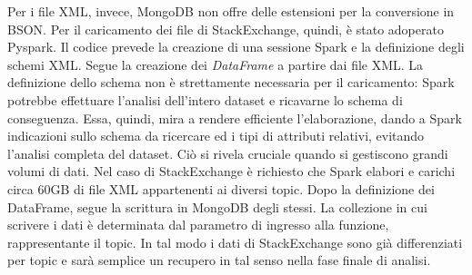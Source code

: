 Per i file XML, invece, MongoDB non offre delle estensioni per la conversione in BSON. Per il caricamento dei file di StackExchange, quindi, è stato adoperato Pyspark. Il codice prevede la creazione di una sessione Spark e la definizione degli schemi XML. Segue la creazione dei \emph{DataFrame} a partire dai file XML. La definizione dello schema non è strettamente necessaria per il caricamento: Spark potrebbe effettuare l'analisi dell'intero dataset e ricavarne lo schema di conseguenza. Essa, quindi, mira a rendere efficiente l'elaborazione, dando a Spark indicazioni sullo schema da ricercare ed i tipi di attributi relativi, evitando l'analisi completa del dataset. Ciò si rivela cruciale quando si gestiscono grandi volumi di dati. Nel caso di StackExchange è richiesto che Spark elabori e carichi circa 60GB di file XML appartenenti ai diversi topic. Dopo la definizione dei DataFrame, segue la scrittura in MongoDB degli stessi. La collezione in cui scrivere i dati è determinata dal parametro di ingresso alla funzione, rappresentante il topic. In tal modo i dati di StackExchange sono già differenziati per topic e sarà semplice un recupero in tal senso nella fase finale di analisi.
